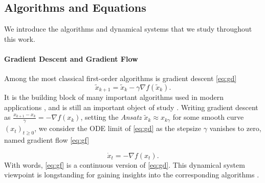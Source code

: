 \documentclass{article}
\newcommand{\jh}[1]{{\color{red} #1}}
\def\xcont{(x_t)_{t\ge 0}}
\theoremstyle{plain}
\theoremstyle{definition}
\theoremstyle{remark}
\begin{document}
\subsection{Algorithms and Equations}
We introduce the algorithms and dynamical systems that we study throughout this work.

\paragraph{Gradient Descent and Gradient Flow \:}
Among the most classical first-order algorithms is gradient descent \eqref{eq:gd}
\begin{equation}\label{eq:gd}\tag{GD}
    \tilde x_{k+1} =\tilde x_k - \gamma \nabla f(\tilde x_k).
\end{equation}
It is the building block of many important algorithms used in modern applications \cite{hinton2012rmsprop,ghadimi2013stochastic,kingma2014adam,romano2017little}, and is still an important object of study \cite{malitsky2020adaptive,cohengradient}. 
 Writing gradient descent as $ \frac{x_{k+1} - x_k}{\gamma } = -\nabla f(x_k)$, setting the \textit{Ansatz} $\tilde x_k \approx x_{k\gamma }$ for some smooth curve $\xcont$, we consider the ODE limit of \eqref{eq:gd} as the stepsize $\gamma $ vanishes to zero, named gradient flow \eqref{eq:gf} 

\begin{equation}\label{eq:gf}\tag{GF}
    \dot{x}_t = - \nabla f(x_t). 
\end{equation}
With words, \eqref{eq:gf} is a continuous version of \eqref{eq:gd}. This dynamical system viewpoint is longstanding for gaining insights into the corresponding algorithms \cite{ambrosio2005gradient, benaim2006dynamics}. %
\end{document}
